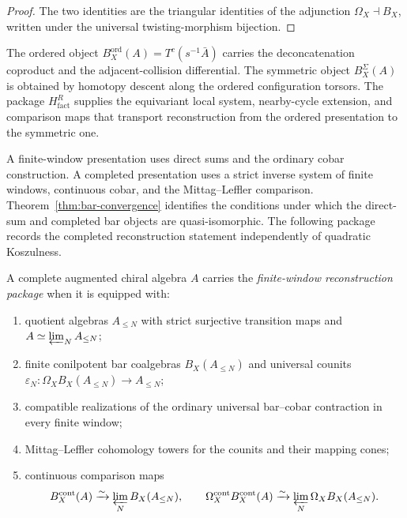 \begin{proof}
The two identities are the triangular identities of the adjunction
\(\Omega_X\dashv B_X\), written under the universal
twisting-morphism bijection.
\end{proof}

\begin{remark}
\label{rem:bar-cobar-platonic-foundational-scope}
The ordered object
\(B_X^{\mathrm{ord}}(A)=T^c(s^{-1}\bar A)\) carries the
deconcatenation coproduct and the adjacent-collision differential.
The symmetric object \(B_X^\Sigma(A)\) is obtained by homotopy descent
along the ordered configuration torsors.  The package
\(H_{\mathrm{fact}}^R\) supplies the equivariant local system,
nearby-cycle extension, and comparison maps that transport
reconstruction from the ordered presentation to the symmetric one.
\end{remark}

\begin{remark}
\label{rem:bar-cobar-platonic-class-M-ambient}
A finite-window presentation uses direct sums and the ordinary cobar
construction.  A completed presentation uses a strict inverse system
of finite windows, continuous cobar, and the Mittag--Leffler
comparison.  Theorem~\ref{thm:bar-convergence} identifies the
conditions under which the direct-sum and completed bar objects are
quasi-isomorphic.  The following package records the completed
reconstruction statement independently of quadratic Koszulness.
\end{remark}

\begin{definition}
\label{def:finite-window-essential-image-bci}
A complete augmented chiral algebra \(A\) carries the
\emph{finite-window reconstruction package} when it is equipped with:
\begin{enumerate}[label=\textup{(R\arabic*)}]
\item quotient algebras \(A_{\leq N}\) with strict surjective
transition maps and \(A\simeq\varprojlim_NA_{\leq N}\);
\item finite conilpotent bar coalgebras \(B_X(A_{\leq N})\) and
universal counits
\(\varepsilon_N\colon\Omega_XB_X(A_{\leq N})\to A_{\leq N}\);
\item compatible realizations of the ordinary universal
bar--cobar contraction in every finite window;
\item Mittag--Leffler cohomology towers for the counits and their
mapping cones;
\item continuous comparison maps
\[
B_X^{\mathrm{cont}}(A)\xrightarrow{\sim}
\varprojlim_NB_X(A_{\leq N}),
\qquad
\Omega_X^{\mathrm{cont}}B_X^{\mathrm{cont}}(A)
\xrightarrow{\sim}
\varprojlim_N\Omega_XB_X(A_{\leq N}).
\]
\end{enumerate}
\end{definition}


